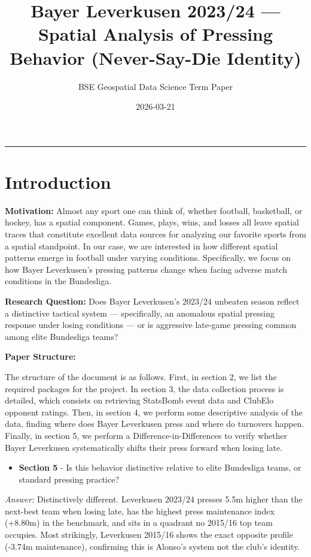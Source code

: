 \documentclass[
]{article}
\title{Bayer Leverkusen 2023/24 --- Spatial Analysis of Pressing
Behavior (Never-Say-Die Identity)}
\subtitle{BSE Geospatial Data Science \textbar{} Term Paper}
\author{}
\date{\vspace{-2.5em}2026-03-21}
\providecommand{\tightlist}{%
  \setlength{\itemsep}{0pt}\setlength{\parskip}{0pt}}
\begin{document}
\maketitle

{
\setcounter{tocdepth}{3}
\tableofcontents
}
\begin{center}\rule{0.5\linewidth}{0.5pt}\end{center}

\section{Introduction}\label{introduction}

\textbf{Motivation:} Almost any sport one can think of, whether
football, basketball, or hockey, has a spatial component. Games, plays,
wins, and losses all leave spatial traces that constitute excellent data
sources for analyzing our favorite sports from a spatial standpoint. In
our case, we are interested in how different spatial patterns emerge in
football under varying conditions. Specifically, we focus on how Bayer
Leverkusen's pressing patterns change when facing adverse match
conditions in the Bundesliga.

\textbf{Research Question:} Does Bayer Leverkusen's 2023/24 unbeaten
season reflect a distinctive tactical system --- specifically, an
anomalous spatial pressing response under losing conditions --- or is
aggressive late-game pressing common among elite Bundesliga teams?

\textbf{Paper Structure:}

The structure of the document is as follows. First, in section 2, we
list the required packages for the project. In section 3, the data
collection process is detailed, which consists on retrieving StatsBomb
event data and ClubElo opponent ratings. Then, in section 4, we perform
some descriptive analysis of the data, finding where does Bayer
Leverkusen press and where do turnovers happen. Finally, in section 5,
we perform a Difference-in-Differences to verify whether Bayer
Leverkusen systematically shifts their press forward when losing late.

\begin{itemize}
\tightlist
\item
  \textbf{Section 5} - Is this behavior distinctive relative to elite
  Bundesliga teams, or standard pressing practice?
\end{itemize}

\emph{Answer:} Distinctively different. Leverkusen 2023/24 presses 5.5m
higher than the next-best team when losing late, has the highest press
maintenance index (+8.80m) in the benchmark, and sits in a quadrant no
2015/16 top team occupies. Most strikingly, Leverkusen 2015/16 shows the
exact opposite profile (-3.74m maintenance), confirming this is Alonso's
system not the club's identity.
\end{document}
